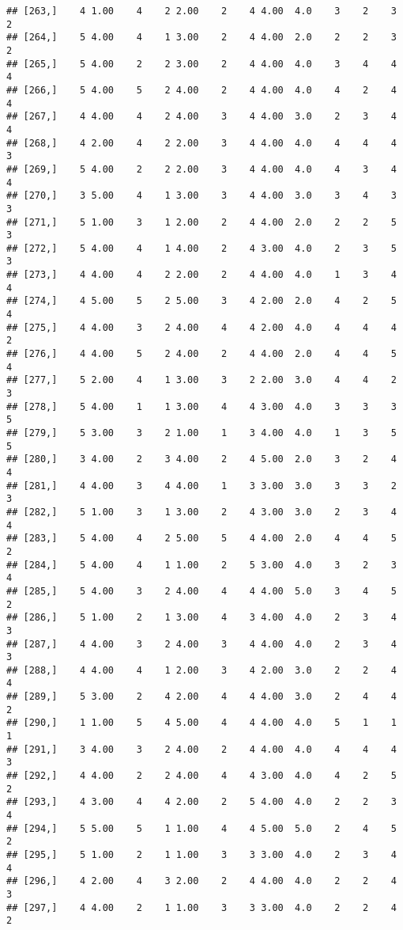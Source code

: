 \documentclass[]{article}
\begin{document}
\begin{verbatim}
## [263,]    4 1.00    4    2 2.00    2    4 4.00  4.0    3    2    3    2
## [264,]    5 4.00    4    1 3.00    2    4 4.00  2.0    2    2    3    2
## [265,]    5 4.00    2    2 3.00    2    4 4.00  4.0    3    4    4    4
## [266,]    5 4.00    5    2 4.00    2    4 4.00  4.0    4    2    4    4
## [267,]    4 4.00    4    2 4.00    3    4 4.00  3.0    2    3    4    4
## [268,]    4 2.00    4    2 2.00    3    4 4.00  4.0    4    4    4    3
## [269,]    5 4.00    2    2 2.00    3    4 4.00  4.0    4    3    4    4
## [270,]    3 5.00    4    1 3.00    3    4 4.00  3.0    3    4    3    3
## [271,]    5 1.00    3    1 2.00    2    4 4.00  2.0    2    2    5    3
## [272,]    5 4.00    4    1 4.00    2    4 3.00  4.0    2    3    5    3
## [273,]    4 4.00    4    2 2.00    2    4 4.00  4.0    1    3    4    4
## [274,]    4 5.00    5    2 5.00    3    4 2.00  2.0    4    2    5    4
## [275,]    4 4.00    3    2 4.00    4    4 2.00  4.0    4    4    4    2
## [276,]    4 4.00    5    2 4.00    2    4 4.00  2.0    4    4    5    4
## [277,]    5 2.00    4    1 3.00    3    2 2.00  3.0    4    4    2    3
## [278,]    5 4.00    1    1 3.00    4    4 3.00  4.0    3    3    3    5
## [279,]    5 3.00    3    2 1.00    1    3 4.00  4.0    1    3    5    5
## [280,]    3 4.00    2    3 4.00    2    4 5.00  2.0    3    2    4    4
## [281,]    4 4.00    3    4 4.00    1    3 3.00  3.0    3    3    2    3
## [282,]    5 1.00    3    1 3.00    2    4 3.00  3.0    2    3    4    4
## [283,]    5 4.00    4    2 5.00    5    4 4.00  2.0    4    4    5    2
## [284,]    5 4.00    4    1 1.00    2    5 3.00  4.0    3    2    3    4
## [285,]    5 4.00    3    2 4.00    4    4 4.00  5.0    3    4    5    2
## [286,]    5 1.00    2    1 3.00    4    3 4.00  4.0    2    3    4    3
## [287,]    4 4.00    3    2 4.00    3    4 4.00  4.0    2    3    4    3
## [288,]    4 4.00    4    1 2.00    3    4 2.00  3.0    2    2    4    4
## [289,]    5 3.00    2    4 2.00    4    4 4.00  3.0    2    4    4    2
## [290,]    1 1.00    5    4 5.00    4    4 4.00  4.0    5    1    1    1
## [291,]    3 4.00    3    2 4.00    2    4 4.00  4.0    4    4    4    3
## [292,]    4 4.00    2    2 4.00    4    4 3.00  4.0    4    2    5    2
## [293,]    4 3.00    4    4 2.00    2    5 4.00  4.0    2    2    3    4
## [294,]    5 5.00    5    1 1.00    4    4 5.00  5.0    2    4    5    2
## [295,]    5 1.00    2    1 1.00    3    3 3.00  4.0    2    3    4    4
## [296,]    4 2.00    4    3 2.00    2    4 4.00  4.0    2    2    4    3
## [297,]    4 4.00    2    1 1.00    3    3 3.00  4.0    2    2    4    2

\end{verbatim}
\end{document}
